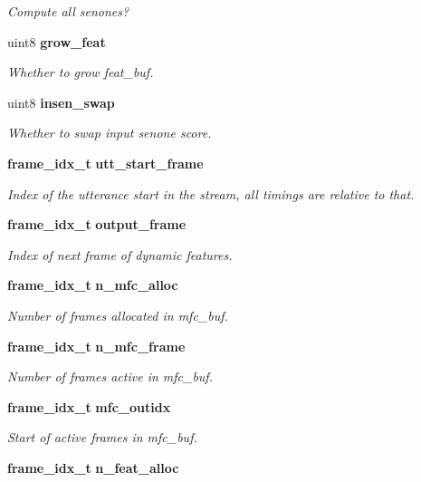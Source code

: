 \begin{DoxyCompactItemize}
\begin{DoxyCompactList}\small\item\em Compute all senones? \end{DoxyCompactList}\item 
uint8 {\bf grow\-\_\-feat}
\begin{DoxyCompactList}\small\item\em Whether to grow feat\-\_\-buf. \end{DoxyCompactList}\item 
uint8 {\bf insen\-\_\-swap}
\begin{DoxyCompactList}\small\item\em Whether to swap input senone score. \end{DoxyCompactList}\item 
{\bf frame\-\_\-idx\-\_\-t} {\bf utt\-\_\-start\-\_\-frame}
\begin{DoxyCompactList}\small\item\em Index of the utterance start in the stream, all timings are relative to that. \end{DoxyCompactList}\item 
{\bf frame\-\_\-idx\-\_\-t} {\bf output\-\_\-frame}
\begin{DoxyCompactList}\small\item\em Index of next frame of dynamic features. \end{DoxyCompactList}\item 
{\bf frame\-\_\-idx\-\_\-t} {\bf n\-\_\-mfc\-\_\-alloc}\label{structacmod__s_af4fa71ce8be75356a1f472959a9ff6d1}

\begin{DoxyCompactList}\small\item\em Number of frames allocated in mfc\-\_\-buf. \end{DoxyCompactList}\item 
{\bf frame\-\_\-idx\-\_\-t} {\bf n\-\_\-mfc\-\_\-frame}\label{structacmod__s_a1c5d63882997211e57ed698e33080958}

\begin{DoxyCompactList}\small\item\em Number of frames active in mfc\-\_\-buf. \end{DoxyCompactList}\item 
{\bf frame\-\_\-idx\-\_\-t} {\bf mfc\-\_\-outidx}\label{structacmod__s_afc6ef051f5de03c3f51aa740ff10a99b}

\begin{DoxyCompactList}\small\item\em Start of active frames in mfc\-\_\-buf. \end{DoxyCompactList}\item 
{\bf frame\-\_\-idx\-\_\-t} {\bf n\-\_\-feat\-\_\-alloc}\label{structacmod__s_a8269cb11354683ba83f1994b46e15466}


\end{DoxyCompactItemize}
